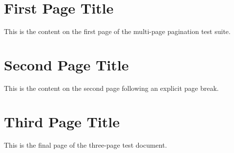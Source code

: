 \documentclass{article}
\begin{document}
\section{First Page Title}
This is the content on the first page of the multi-page pagination test suite.

\newpage

\section{Second Page Title}
This is the content on the second page following an explicit page break.

\newpage

\section{Third Page Title}
This is the final page of the three-page test document.
\end{document}
